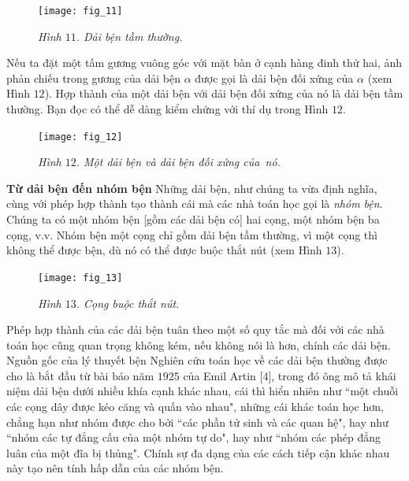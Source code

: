 \begin{multicols}{2}
\begin{figure}[H]
		\centering
		\captionsetup{labelformat= empty, justification=centering}
		\texttt{[image: fig\_11]}
		\caption{\small\textit{\color{duongvaotoanhoc}Hình $11$. Dải bện tầm thường.}}
		\vspace*{-10pt}
	\end{figure}
	Nếu ta đặt một tấm gương vuông góc với mặt bàn ở cạnh hàng đinh thứ hai, ảnh phản chiếu trong gương của dải bện $\alpha$ được gọi là dải bện đối xứng của $\alpha$ (xem Hình $12$). Hợp thành của một dải bện với dải bện đối xứng của nó là dải bện tầm thường. Bạn đọc có thể dễ dàng kiểm chứng với thí dụ trong Hình $12$.
	\begin{figure}[H]
		\vspace*{-5pt}
		\centering
		\captionsetup{labelformat= empty, justification=centering}
		\texttt{[image: fig\_12]}
		\caption{\small\textit{\color{duongvaotoanhoc}Hình $12$. Một dải bện và dải bện đối xứng của~nó.}}
		\vspace*{-5pt}
	\end{figure}
	\textbf{\color{duongvaotoanhoc}Từ dải bện đến nhóm bện}
	\vskip 0.1cm
	Những dải bện, như chúng ta vừa định nghĩa, cùng với phép hợp thành tạo thành cái mà các nhà toán học gọi là \textit{nhóm bện}. Chúng ta có một nhóm bện [gồm các dải bện có] hai cọng, một nhóm bện ba cọng, v.v. Nhóm bện một cọng chỉ gồm dải bện tầm thường, vì một cọng thì không thể được bện, dù nó có thể được buộc thắt nút (xem Hình $13$).
	\begin{figure}[H]
		\vspace*{-5pt}
		\centering
		\captionsetup{labelformat= empty, justification=centering}
		\texttt{[image: fig\_13]}
		\caption{\small\textit{\color{duongvaotoanhoc}Hình $13$. Cọng buộc thắt nút.}}
		\vspace*{-10pt}
	\end{figure}
	Phép hợp thành của các dải bện tuân theo một số quy tắc mà đối với các nhà toán học cũng quan trọng không kém, nếu không nói là hơn, chính các dải bện.
	Nguồn gốc của lý thuyết bện
	\vskip 0.1cm
	Nghiên cứu toán học về các dải bện thường được cho là bắt đầu từ bài báo năm $1925$ của Emil Artin [$4$], trong đó ông mô tả khái niệm dải bện dưới nhiều khía cạnh khác nhau, cái thì hiển nhiên như ``một chuỗi các cọng dây được kéo căng và quấn vào nhau", những cái khác toán học hơn, chẳng hạn như nhóm được cho bởi ``các phần tử sinh và các quan hệ", hay như ``nhóm các tự đẳng cấu của một nhóm tự do", hay như  ``nhóm các phép đẳng luân của một đĩa bị thủng". Chính sự đa dạng của các cách tiếp cận khác nhau này tạo nên tính hấp dẫn của các nhóm bện.

\end{multicols}
